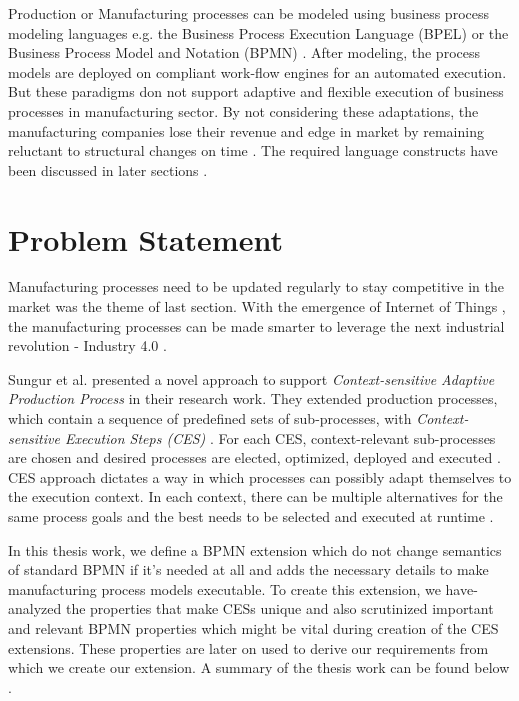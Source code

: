 Production or Manufacturing processes can be modeled using business process modeling languages e.g. the Business Process Execution Language (\acs{BPEL}) \cite{BPELSPEC} or the Business Process Model and Notation (\acs{BPMN}) \cite{OMGSPEC}. After modeling, the process models are deployed on compliant work-flow engines for an automated execution. But these paradigms don not support adaptive and flexible execution of business processes in manufacturing sector. By not considering these adaptations, the manufacturing companies lose their revenue and edge in market by remaining reluctant to structural changes on time \cite{TIMURCIRP,CONWORKFLOW}. The required language constructs have been discussed in later sections .

\section{Problem Statement}
Manufacturing processes need to be updated regularly to stay competitive in the market was the theme of last section. With the emergence of Internet of Things , the manufacturing processes can be made smarter to leverage the next industrial revolution - Industry 4.0 .

Sungur et al. \cite{TIMURCIRP} presented a novel approach to support \textit{Context-sensitive Adaptive Production Process} in their research work. They extended production processes, which contain a sequence of predefined sets of sub-processes, with \textit{Context-sensitive Execution Steps (\acs{CES})} . For each \acs{CES}, context-relevant sub-processes are chosen and desired processes are elected, optimized, deployed and executed \cite{TIMURCIRP}. \acs{CES} approach dictates a way in which processes can possibly adapt themselves to the execution context. In each context, there can be multiple alternatives for the same process goals and the best needs to be selected and executed at runtime \cite{TIMURCIRP}.

In this thesis work, we define a \acs{BPMN} extension which do not change semantics of standard \acs{BPMN} if it's needed at all and adds the necessary details to make manufacturing process models executable. To create this extension, we have- analyzed the properties that make \acs{CES}s unique and also scrutinized important and relevant \acs{BPMN} properties which might be vital during creation of the \acs{CES} extensions. These properties are later on used to derive our requirements from which we create our extension. A summary of the thesis work can be found below .

